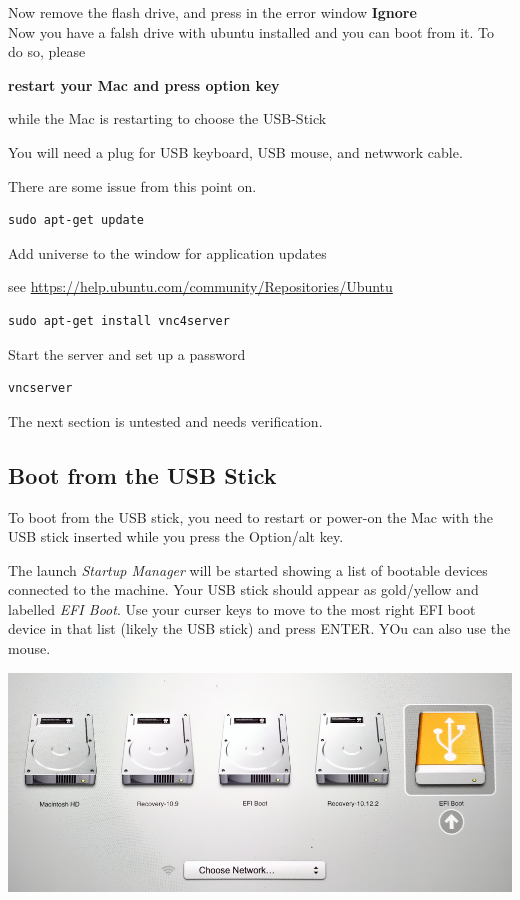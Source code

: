 Now remove the flash drive, and press in the error window
\textbf{Ignore}\\
Now you have a falsh drive with ubuntu installed and you can boot from
it. To do so, please

\textbf{restart your Mac and press option key}

while the Mac is restarting to choose the USB-Stick

You will need a plug for USB keyboard, USB mouse, and netwwork cable.

There are some issue from this point on.

\begin{lstlisting}
sudo apt-get update
\end{lstlisting}

Add universe to the window for application updates

see \url{https://help.ubuntu.com/community/Repositories/Ubuntu}

\begin{lstlisting}
sudo apt-get install vnc4server
\end{lstlisting}

Start the server and set up a password

\begin{lstlisting}
vncserver
\end{lstlisting}

\begin{WARNING}
The next section is untested and needs verification. 
\end{WARNING}

\subsection{Boot from the USB Stick}

To boot from the USB stick, you need to restart or power-on the Mac with
the USB stick inserted while you press the Option/alt key.

The launch \emph{Startup Manager} will be started showing a list of
bootable devices connected to the machine. Your USB stick should appear
as gold/yellow and labelled \emph{EFI Boot}. Use your curser keys to
move to the most right EFI boot device in that list (likely the USB
stick) and press ENTER. YOu can also use the mouse.

\includegraphics[width=0.8\columnwidth]{images/ba4c21e1ca753cf.png}

